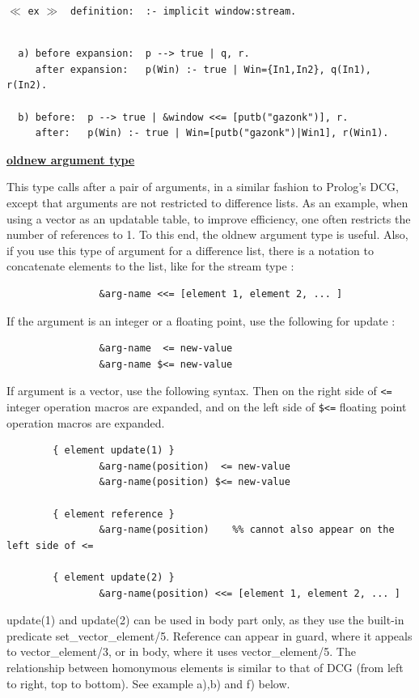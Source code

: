 $\ll$ \verb|ex| $\gg$ \verb| definition:  :- implicit window:stream.|
\begin {verbatim}

  a) before expansion:  p --> true | q, r.
     after expansion:   p(Win) :- true | Win={In1,In2}, q(In1), r(In2).

  b) before:  p --> true | &window <<= [putb("gazonk")], r.
     after:   p(Win) :- true | Win=[putb("gazonk")|Win1], r(Win1).
\end{verbatim}
\vspace{1ex}

\noindent\underline{\bf oldnew argument type}
 \vspace{1ex}\par
This type calls after a pair of arguments, in a similar fashion to Prolog's
DCG, except that arguments are not restricted to difference lists. As an
example, when using a vector as an updatable table, to improve efficiency, one
often restricts the number of references to 1. To this end, the oldnew argument
type is useful. Also, if you use this type of argument for a difference list,
there is a notation to concatenate elements to the list, like for the stream
type :\index{\verb|<<=|}
\begin{verbatim}
                &arg-name <<= [element 1, element 2, ... ]
\end{verbatim}
If the argument is an integer or a floating point,
use the following for update :
\begin{verbatim}
                &arg-name  <= new-value
                &arg-name $<= new-value
\end{verbatim}
If argument is a vector, use the following syntax.
Then on the right side of \verb|<=| integer operation macros are expanded, and
on the left side of \verb|$<=| floating point operation macros are expanded.
\index{\verb|<=|} \index{\verb|$<=|}
\begin{verbatim}
        { element update(1) }
                &arg-name(position)  <= new-value
                &arg-name(position) $<= new-value

        { element reference }
                &arg-name(position)    %% cannot also appear on the left side of <=

        { element update(2) }
                &arg-name(position) <<= [element 1, element 2, ... ]
\end{verbatim}
update(1) and update(2) can be used in body part only,
 as they use the built-in predicate
set_vector_element/5. Reference can appear in guard, where it appeals to
vector_element/3, or in body, where it uses vector_element/5. The relationship
between homonymous elements is similar to that of DCG (from left to right,
top to bottom). See example a),b) and f) below.

